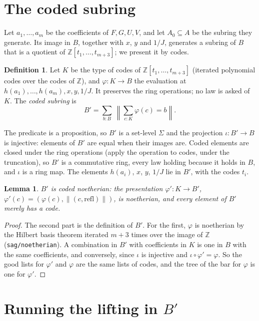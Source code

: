 \documentclass[11pt]{amsart}
\newtheorem{lemma}[theorem]{Lemma}
\theoremstyle{definition}
\newtheorem{definition}[theorem]{Definition}
\theoremstyle{remark}
\newcommand{\code}[1]{\texttt{#1}}
\newcommand{\mere}[1]{\left\lVert #1\right\rVert}
\begin{document}
\section{The coded subring}

Let $a_1,\ldots,a_m$ be the coefficients of $F,G,U,V$, and let
$A_0\subseteq A$ be the subring they generate. Its image in $B$,
together with $x$, $y$ and $1/J$, generates a subring of $B$ that is a
quotient of $\mathbb Z[t_1,\ldots,t_{m+3}]$; we present it by codes.

\begin{definition}
Let $K$ be the type of codes of $\mathbb Z[t_1,\ldots,t_{m+3}]$
(iterated polynomial codes over the codes of $\mathbb Z$), and
$\varphi:K\to B$ the evaluation at $h(a_1),\ldots,h(a_m),x,y,1/J$. It
preserves the ring operations; no law is asked of $K$. The \emph{coded
subring} is
\[
 B'=\sum_{b:B}\ \mere{\textstyle\sum_{c:K}\varphi(c)=b}.
\]
\end{definition}

The predicate is a proposition, so $B'$ is a set-level $\Sigma$ and the
projection $\iota:B'\to B$ is injective: elements of $B'$ are equal
when their images are. Coded elements are closed under the ring
operations (apply the operation to codes, under the truncation), so
$B'$ is a commutative ring, every law holding because it holds in $B$,
and $\iota$ is a ring map. The elements $h(a_i)$, $x$, $y$, $1/J$ lie
in $B'$, with the codes $t_i$.

\begin{lemma}\label{lem:coded}
$B'$ is \emph{coded noetherian}: the presentation $\varphi':K\to B'$,
$\varphi'(c)=(\varphi(c),\mere{(c,\mathrm{refl})})$, is noetherian, and
every element of $B'$ merely has a code.
\end{lemma}
\begin{proof}
The second part is the definition of $B'$. For the first, $\varphi$ is
noetherian by the Hilbert basis theorem iterated $m+3$ times over the
image of $\mathbb Z$ (\code{sag/noetherian}). A combination in $B'$ with
coefficients in $K$ is one in $B$ with the same coefficients, and
conversely, since $\iota$ is injective and $\iota\circ\varphi'=\varphi$.
So the good lists for $\varphi'$ and $\varphi$ are the same lists of
codes, and the tree of the bar for $\varphi$ is one for $\varphi'$.
\end{proof}

\section{Running the lifting in \texorpdfstring{$B'$}{B'}}
\end{document}
